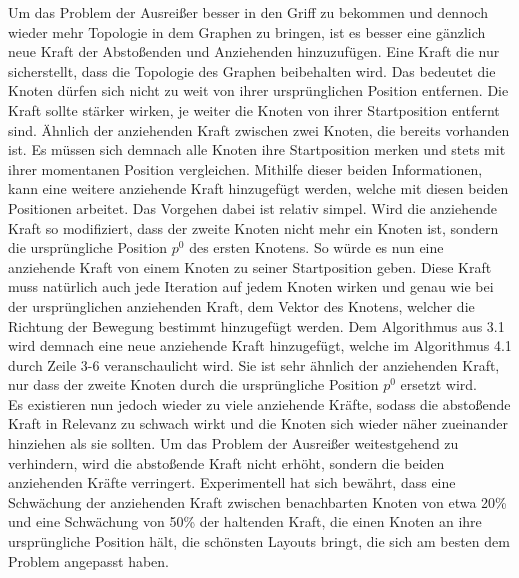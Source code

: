 Um das Problem der Ausreißer besser in den Griff zu bekommen und dennoch wieder mehr Topologie in dem Graphen zu bringen, ist es besser eine gänzlich neue Kraft der Abstoßenden und Anziehenden hinzuzufügen. Eine Kraft die nur sicherstellt, dass die Topologie des Graphen beibehalten wird. Das bedeutet die Knoten dürfen sich nicht zu weit von ihrer ursprünglichen Position entfernen. Die Kraft sollte stärker wirken, je weiter die Knoten von ihrer Startposition entfernt sind. Ähnlich der anziehenden Kraft zwischen zwei Knoten, die bereits vorhanden ist. Es müssen sich demnach alle Knoten ihre Startposition merken und stets mit ihrer momentanen Position vergleichen. Mithilfe dieser beiden Informationen, kann eine weitere anziehende Kraft hinzugefügt werden, welche mit diesen beiden Positionen arbeitet. Das Vorgehen dabei ist relativ simpel. Wird die anziehende Kraft so modifiziert, dass der zweite Knoten nicht mehr ein Knoten ist, sondern die ursprüngliche Position $p^{0}$ des ersten Knotens. So würde es nun eine anziehende Kraft von einem Knoten zu seiner Startposition geben. Diese Kraft muss natürlich auch jede Iteration auf jedem Knoten wirken und genau wie bei der ursprünglichen anziehenden Kraft, dem Vektor des Knotens, welcher die Richtung der Bewegung bestimmt hinzugefügt werden. Dem Algorithmus aus 3.1 wird demnach eine neue anziehende Kraft hinzugefügt, welche im Algorithmus 4.1 durch Zeile 3-6 veranschaulicht wird. Sie ist sehr ähnlich der anziehenden Kraft, nur dass der zweite Knoten durch die ursprüngliche Position $p^{0}$ ersetzt wird. \\
 


Es existieren nun jedoch wieder zu viele anziehende Kräfte, sodass die abstoßende Kraft in Relevanz zu schwach wirkt und die Knoten sich wieder näher zueinander hinziehen als sie sollten. Um das Problem der Ausreißer weitestgehend zu verhindern, wird die abstoßende Kraft nicht erhöht, sondern die beiden anziehenden Kräfte verringert. Experimentell hat sich bewährt, dass eine Schwächung der anziehenden Kraft zwischen benachbarten Knoten von etwa 20\% und eine Schwächung von 50\% der haltenden Kraft, die einen Knoten an ihre ursprüngliche Position hält, die schönsten Layouts bringt, die sich am besten dem Problem angepasst haben. \\

